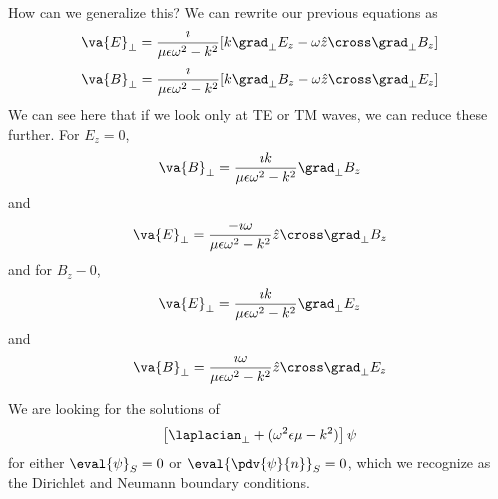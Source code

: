 \documentclass[a4paper,twoside,master.tex]{subfiles}
\begin{document}
How can we generalize this? We can rewrite our previous equations as
\begin{equation}
    \va{E}_{\perp} = \frac{\imath}{\mu \epsilon \omega^2 - k^2} [k \grad_{\perp}{E_z} - \omega \hat{z} \cross \grad_{\perp}{B_z}] 
\end{equation}
\begin{equation}
    \va{B}_{\perp} = \frac{\imath}{\mu \epsilon \omega^2 - k^2} [k \grad_{\perp}{B_z} - \omega \hat{z} \cross \grad_{\perp}{E_z}] 
\end{equation}
We can see here that if we look only at TE or TM waves, we can reduce these further. For $ E_z = 0 $,
\begin{equation}
    \va{B}_{\perp} = \frac{\imath k}{\mu \epsilon \omega^2 - k^2} \grad_{\perp}{B_z}
\end{equation}
and
\begin{equation}
    \va{E}_{\perp} = \frac{- \imath \omega}{\mu \epsilon \omega^2 - k^2} \hat{z} \cross \grad_{\perp}{B_z}
\end{equation}
and for $ B_z - 0 $,
\begin{equation}
    \va{E}_{\perp} = \frac{\imath k}{\mu \epsilon \omega^2 - k^2} \grad_{\perp}{E_z}
\end{equation}
and
\begin{equation}
    \va{B}_{\perp} = \frac{\imath \omega}{\mu \epsilon \omega^2 - k^2} \hat{z} \cross \grad_{\perp}{E_z}
\end{equation}

We are looking for the solutions of
\begin{equation}
    \left[ \laplacian_{\perp} + (\omega^2 \epsilon \mu - k^2) \right] \psi
\end{equation}
for either $ \eval{\psi}_{S} = 0 $ or $ \eval{\pdv{\psi}{n}}_{S} = 0 $, which we recognize as the Dirichlet and Neumann boundary conditions.
\end{document}
